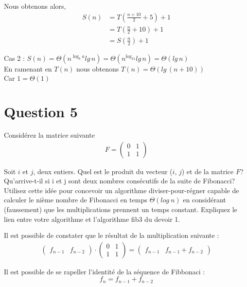\documentclass[12pt]{article}
\begin{document}
Nous obtenons alors, 
\begin{align*}
	S(n) &= T(\frac{n+10}{2}+5)+1 \\
	&= T(\frac{n}{2}+10)+1 \\
	&= S(\frac{n}{2}) + 1
\end{align*}

Cas 2 : \(S(n) = \Theta(n^{\log_ba}lg \, n) = \Theta(n^{\log_21}lg \, n) = \Theta(lg \, n) \) \\
En ramenant en \(T(n)\) nous obtenons \(T(n)=\Theta(lg \, (n+10))\) \\

Car \(1 = \Theta(1)\) \\
\newpage

\section*{Question 5}
Considérez la matrice suivante
\begin{align*}
	F =
	\begin{pmatrix}
		0 & 1 \\
		1 & 1
	\end{pmatrix}
\end{align*}

Soit \(i\) et \(j\), deux entiers. Quel est le produit du vecteur (\(i\), \(j\)) et de la matrice \(F\)? Qu’arrive-t-il si i et j sont deux nombres consécutifs de la suite de Fibonacci? Utilisez cette idée pour concevoir un algorithme diviser-pour-régner capable de calculer le nième nombre de Fibonacci en temps \(\Theta (log \: n)\) en considérant (faussement) que les multiplications prennent un temps constant. Expliquez le lien entre votre algorithme et l’algorithme fib3 du devoir 1. \newline

Il est possible de constater que le résultat de la multiplication suivante :
\begin{align*}
	\begin{pmatrix}
		f_{n-1} & f_{n-2}
	\end{pmatrix}
	\cdot
	\begin{pmatrix}
		0 & 1 \\
		1 & 1
	\end{pmatrix}
	=
	\begin{pmatrix}
		f_{n-1} & f_{n-1} + f_{n-2}
	\end{pmatrix}
\end{align*}

Il est possible de se rapeller l'identité de la séquence de Fibbonaci :
\[ f_{n} = f_{n-1} + f_{n-2} \]
\end{document}
